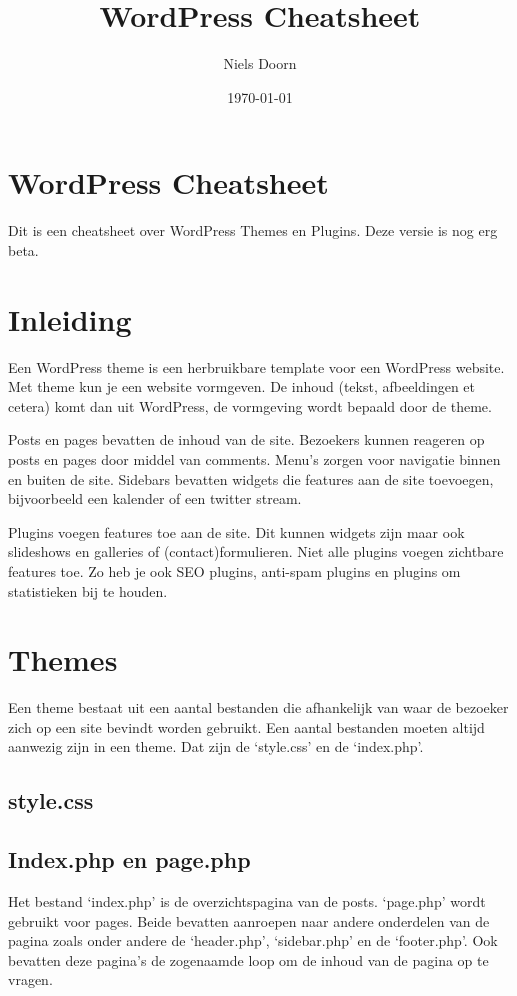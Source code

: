 \documentclass[8pt,pagesize,footinclude=false,headinclude=false]{scrartcl}
\title{WordPress Cheatsheet}
\author{Niels Doorn}
\date{\today}
\begin{document}
\ifpdf
{}
\else
{}
\fi

\begin{multicols*}{4}

\section*{WordPress Cheatsheet}
Dit is een cheatsheet over WordPress Themes en Plugins. Deze versie is nog erg beta.

\section*{Inleiding}
Een WordPress theme is een herbruikbare template voor een WordPress website. Met theme kun je een website vormgeven. De inhoud (tekst, afbeeldingen et cetera) komt dan uit WordPress, de vormgeving wordt bepaald door de theme.

Posts en pages bevatten de inhoud van de site. Bezoekers kunnen reageren op posts en pages door middel van comments. Menu's zorgen voor navigatie binnen en buiten de site. Sidebars bevatten widgets die features aan de site toevoegen, bijvoorbeeld een kalender of een twitter stream.

Plugins voegen features toe aan de site. Dit kunnen widgets zijn maar ook slideshows en galleries of (contact)formulieren. Niet alle plugins voegen zichtbare features toe. Zo heb je ook SEO plugins, anti-spam plugins en plugins om statistieken bij te houden.

\section*{Themes}
Een theme bestaat uit een aantal bestanden die afhankelijk van waar de bezoeker zich op een site bevindt worden gebruikt. Een aantal bestanden moeten altijd aanwezig zijn in een theme. Dat zijn de `style.css' en de `index.php'.
\subsection*{style.css}



\subsection*{Index.php en page.php}
Het bestand `index.php' is de overzichtspagina van de posts. `page.php' wordt gebruikt voor pages. Beide bevatten aanroepen naar andere onderdelen van de pagina zoals onder andere de `header.php', `sidebar.php' en de `footer.php'. Ook bevatten deze pagina's de zogenaamde loop om de inhoud van de pagina op te vragen.


\end{multicols*}
\end{document}
